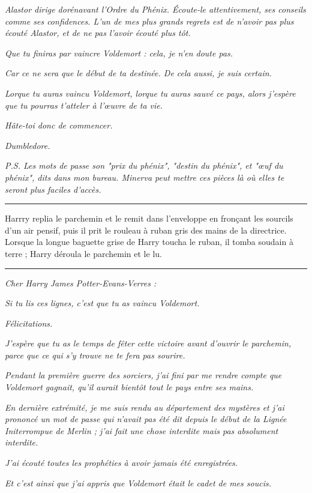 \emph{Alastor dirige dorénavant l'Ordre du Phénix. Écoute-le attentivement, ses conseils comme ses confidences. L'un de mes plus grands regrets est de n'avoir pas plus écouté Alastor, et de ne pas l'avoir écouté plus tôt.} 

\emph{Que tu finiras par vaincre Voldemort : cela, je n'en doute pas.} 

\emph{Car ce ne sera que le début de ta destinée. De cela aussi, je suis certain.} 

\emph{Lorque tu auras vaincu Voldemort, lorque tu auras sauvé ce pays, alors j'espère que tu pourras t'atteler à l'œuvre de ta vie.} 

\emph{Hâte-toi donc de commencer.} 

\emph{Dumbledore.} 

\emph{P.S. Les mots de passe son "prix du phénix", "destin du phénix", et "œuf du phénix", dits dans mon bureau. Minerva peut mettre ces pièces là où elles te seront plus faciles d'accès.} 
\par\noindent\rule{\textwidth}{0.4pt}
Harrry replia le parchemin et le remit dans l'enveloppe en fronçant les sourcils d'un air pensif, puis il prit le rouleau à ruban gris des mains de la directrice. Lorsque la longue baguette grise de Harry toucha le ruban, il tomba soudain à terre ; Harry déroula le parchemin et le lu.
\par\noindent\rule{\textwidth}{0.4pt}
\emph{Cher Harry James Potter-Evans-Verres :} 

\emph{Si tu lis ces lignes, c'est que tu as vaincu Voldemort.} 

\emph{Félicitations.} 

\emph{J'espère que tu as le temps de fêter cette victoire avant d'ouvrir le parchemin, parce que ce qui s'y trouve ne te fera pas sourire.} 

\emph{Pendant la première guerre des sorciers, j'ai fini par me rendre compte que Voldemort gagnait, qu'il aurait bientôt tout le pays entre ses mains.} 

\emph{En dernière extrémité, je me suis rendu au département des mystères et j'ai prononcé un mot de passe qui n'avait pas été dit depuis le début de la Lignée Initerrompue de Merlin ; j'ai fait une chose interdite mais pas absolument interdite.} 

\emph{J'ai écouté toutes les prophéties à avoir jamais été enregistrées.} 

\emph{Et c'est ainsi que j'ai appris que Voldemort était le cadet de mes soucis.} 

